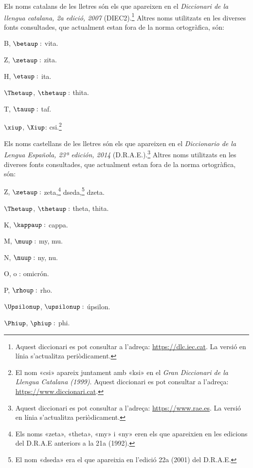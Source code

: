 Els noms catalans de les lletres són els que apareixen en el \textit{Diccionari de la llengua catalana, 2a edició, 2007} (DIEC2).\footnote{Aquest diccionari es pot consultar a l'adreça: \href{http://dlc.iec.cat/}{https://dlc.iec.cat}. La versió en línia s'actualitza periòdicament.} Altres noms utilitzats en
les diverses fonts consultades, que actualment estan fora de la norma ortogràfica, són:
\begin{multicols}{3}
	\begin{list}{}
		{\setlength{\labelwidth}{16mm} \setlength{\leftmargin}{16mm} \setlength{\labelsep}{2mm}}
		\item[B, $\betaup :$] vita.
		\item[Z, $\zetaup :$] zita.
		\item[H, $\etaup :$] ita.
		\item[$\Thetaup$, $\thetaup :$] thita.
		\item[T, $\tauup :$] taf.
		\item[$\xiup$, $\Xiup$:] csi.\footnote{El nom «csi» apareix juntament amb «ksi» en el \textit{Gran Diccionari de la Llengua Catalana (1999)}. Aquest diccionari es pot consultar a l'adreça:  \href{https://www.diccionari.cat/}{https://www.diccionari.cat}.}
	\end{list}
\end{multicols}

Els noms castellans de les lletres són els que apareixen en el \textit{Diccionario de la Lengua Española, 23ª
	edición, 2014} (D.R.A.E.).\footnote{Aquest diccionari es pot consultar a l'adreça:  \href{https://www.rae.es/}{https://www.rae.es}. La versió en línia s'actualitza periòdicament.} Altres noms utilitzats en les diverses fonts
consultades, que actualment estan fora de la norma ortogràfica, són:
\begin{multicols}{3}
	\begin{list}{}
		{\setlength{\labelwidth}{16mm} \setlength{\leftmargin}{16mm} \setlength{\labelsep}{2mm}}
		\item[Z, $\zetaup :$] zeta,\footnote{\label{fn:zeta}Els noms «zeta», «theta», «my» i «ny» eren els que apareixien en les edicions
			del D.R.A.E anteriors a la 21a (1992).} dseda,\footnote{El nom «dseda» era el que apareixia en l'edició 22a (2001) del D.R.A.E.} dzeta.
		\item[$\Thetaup$, $\thetaup :$] theta, thita.
		\item[K, $\kappaup :$] cappa.
		\item[M, $\muup :$] my, mu.
		\item[N, $\nuup :$] ny, nu.
		\item[O, o :] omicrón.
		\item[P, $\rhoup :$] rho.
		\item[$\Upsilonup$, $\upsilonup :$] úpsilon.
		\item[$\Phiup$, $\phiup :$] phi.
	\end{list}
\end{multicols}

